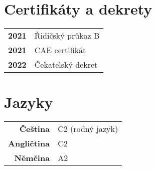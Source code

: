 \documentclass{modernsimplecv}
\newlength{\leftcolwidth}
\begin{document}
\begin{paracol}{2}
{\begin{minipage}[t]{\leftcolwidth}
    \section*{\large{Certifikáty a dekrety}}
    \begin{tabular}{>{\footnotesize\bfseries}r >{\footnotesize}p{}}
        2021 & Řidičský průkaz B \\
        2021 & CAE certifikát \\
        2022 & Čekatelský dekret
    \end{tabular}
    \bigskip

\end{minipage}\hfill
\vspace{1em}

\begin{minipage}[t]{\leftcolwidth}
    \section*{\large{Jazyky}}
    \begin{tabular}{>{\footnotesize\bfseries}r >{\footnotesize}p{}}
        Čeština & C2 (rodný jazyk)\\
        Angličtina & C2 \\
        Němčina & A2 \\
    \end{tabular}
    \bigskip    
\end{minipage}

\begin{minipage}[t]{0.885\leftcolwidth}
    \vspace{-10pt}

\end{minipage}}
\end{paracol}
\end{document}
